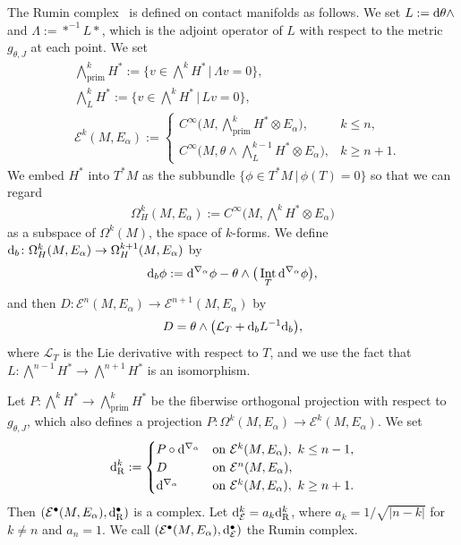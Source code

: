 \documentclass[pdftex]{sigma}
\numberwithin{equation}{section}
\DeclareMathOperator{\Int}{Int}
\DeclareMathOperator{\prim}{prim}
\newcommand{\Rumin}{\mathrm{R}}
\newcommand{\RN}{\cE}
\newcommand{\cE}{\mathcal{E}}
\begin{document}
The Rumin complex~\cite{Rumin-94} is defined on contact manifolds as follows.
We set $L := {\rm d} \theta \wedge $
and $\Lambda := *^{-1} L *$,
which is the adjoint operator of $L$ with respect to the metric $g_{\theta , J}$ at each point.
We set
\begin{align*}
& \textstyle \bigwedge_{\prim}^{k} H^*:=
\big\{
v \in \textstyle \bigwedge^{k} H^*
\, \big| \,
\Lambda v = 0
\big\},
\\
%
%
& \textstyle \bigwedge_{L}^{k} H^*
:=
\big\{
v \in \textstyle \bigwedge^{k} H^*
\, \big| \,
L v = 0
\big\},
\\
& \cE ^k (M , E_{\alpha})
:=
\begin{cases}
 C^\infty \big( M, \bigwedge_{\prim}^{k} H^* \otimes E_{\alpha} \big) , & k \leq n ,\\
 C^\infty \big( M, \theta \wedge\bigwedge_{L}^{k-1} H^* \otimes E_{\alpha} \big) , & k \geq n+1 .
\end{cases}
\end{align*}
We embed $H^*$ into $T^*M$ as the subbundle $ \{ \phi \in T^* M \,|\, \phi (T) = 0 \}$ so that
we can regard
\begin{align*}
\Omega_H^{k} (M, E_{\alpha}) := C^{\infty} \big( M, \textstyle \bigwedge^{k} H^* \otimes E_{\alpha} \big)
\end{align*}
as a subspace of $\Omega^k (M)$, the space of $k$-forms.
We define ${\rm d}_b \colon \Omega_H^{k} (M, E_{\alpha}) \to \Omega_H^{k+1} (M, E_{\alpha})$ by
\[
{\rm d}_b \phi := {\rm d}^{\nabla_{\alpha}} \phi - \theta \wedge \big(\Int_T {\rm d}^{\nabla_{\alpha}} \phi \big)
,
\]
and then $D \colon \cE ^n (M,E_{\alpha}) \to \cE ^{n+1} (M,E_{\alpha}) $ by
\[
D = \theta \wedge \big( \mathcal{L}_T + {\rm d}_b L^{-1} {\rm d}_b \big),
\]
where $\mathcal{L}_T$ is the Lie derivative with respect to $T$,
and we use the fact that $L \colon \textstyle \bigwedge^{n-1} H^* \to\textstyle \bigwedge^{n+1} H^*$ is an isomorphism.

Let $P \colon \textstyle \bigwedge^{k} H^* \to \textstyle \bigwedge_{\prim}^{k} H^* $ be the fiberwise orthogonal projection with respect to $g_{\theta , J}$, which also defines a projection $P \colon \Omega^k (M,E_{\alpha}) \to \cE ^k (M,E_{\alpha}) $.
We set
\[
{\rm d}_{\Rumin }^k
:=
\begin{cases}
P \circ {\rm d}^{\nabla_{\alpha}} & \text{on } \cE ^k (M,E_{\alpha}), \ k \leq n-1, \\
D & \text{on } \cE ^n (M,E_{\alpha}) , \\
{\rm d}^{\nabla_{\alpha}} & \text{on } \cE ^k (M,E_{\alpha}) , \ k \geq n+1.
\end{cases}
\]
Then $(\cE ^\bullet (M,E_{\alpha}), {\rm d}_{\Rumin }^\bullet)$ is a complex.
Let ${\rm d}_\RN ^{k} = a_k {\rm d}_{\Rumin }^{k}$, where
$a_k = 1 / \sqrt{|n-k|}$ for $k \not = n$ and
$a_n = 1$.
We call $(\cE ^\bullet (M,E_{\alpha}), {\rm d}_\RN ^\bullet)$ the Rumin complex.
\end{document}
